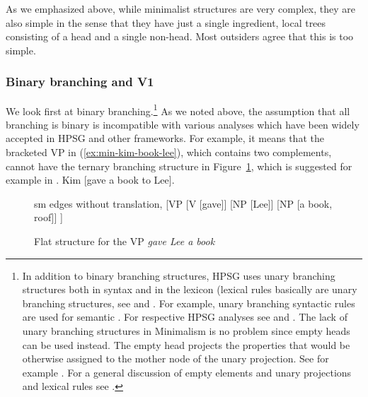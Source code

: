 \documentclass[output=paper]{langsci/langscibook}
\begin{document}
As we emphasized above, while minimalist structures are very complex, they are also simple in the
sense that they have just a single ingredient, local trees consisting of a head and a single
non-head. Most outsiders agree that this is too simple.

\subsubsection{Binary branching and V1}

We look first at binary branching.\footnote{
  In addition to binary branching structures, HPSG uses unary branching structures both in syntax
  and in the lexicon (lexical rules basically are unary branching structures, see
  \citet{Meurers2001a} and .
  For example, unary branching syntactic rules are used for semantic 
  \citep{Partee87a-u}. For respective HPSG analyses see  and
  . The lack of unary branching structures in Minimalism is
  no problem since empty heads can be used instead. The empty head projects the
  properties that would be otherwise assigned to the mother node of the unary projection. See for example . For a
  general discussion of empty elements and unary projections and lexical rules see
  .
% 
} As we noted above, the assumption that all branching is binary is incompatible with various
analyses which have been widely accepted in HPSG and other frameworks. For example, it means that
the bracketed VP in (\ref{ex:min-kim-book-lee}), which contains two complements, cannot have the
ternary branching structure in Figure~\ref{fig:gave-lee-book}, which is suggested for example in
.
\ea
Kim [gave a book to Lee].\label{ex:min-kim-book-lee}
\z
\begin{figure}
	\centering
	\begin{forest} sm edges without translation, 
		[VP
		[V [gave]] [NP [Lee]] [NP [a book, roof]]
		]
	\end{forest}
	\caption{\label{fig:gave-lee-book}Flat structure for the VP \emph{gave Lee a book}}
\end{figure}
\end{document}
